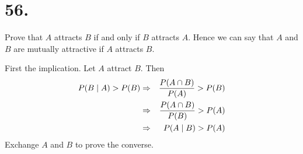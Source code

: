 \section*{56.}
Prove that $A$ attracts $B$ if and only if $B$ attracts $A$.
Hence we can say that
$A$ and $B$ are mutually attractive if $A$ attracts $B$.

\bigskip
\noindent
First the implication.
Let $A$ attract $B$.
Then
\begin{eqnarray*}
P(B\mid A)>P(B)&\Rightarrow&{P(A\cap B)\over P(A)}>P(B)\\
&\Rightarrow&{P(A\cap B)\over P(B)}>P(A)\\
&\Rightarrow&P(A\mid B)>P(A)
\end{eqnarray*}
Exchange $A$ and $B$ to prove the converse.

